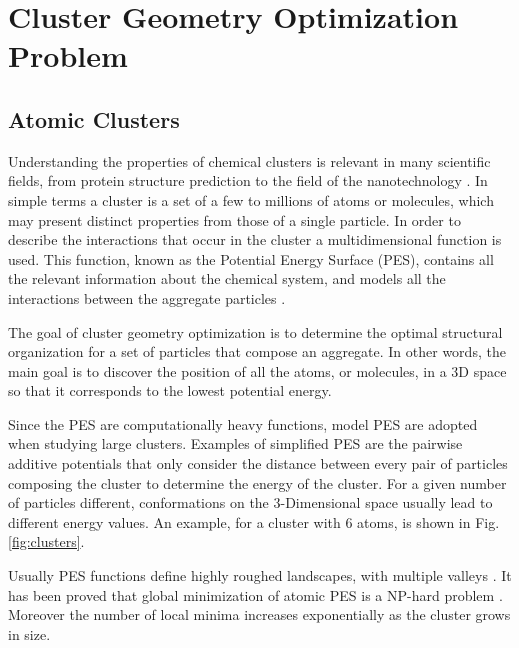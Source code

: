 \chapter{Cluster Geometry Optimization Problem}


\section{Atomic Clusters}

Understanding the properties of chemical clusters is relevant in many scientific fields, from protein structure prediction to the field of the nanotechnology \cite{wales97}. In simple terms a cluster is a set of a few to millions of atoms or molecules, which may present distinct properties from those of a single particle. In order to describe the interactions that occur in the cluster a multidimensional function is used. This function, known as the Potential Energy Surface (PES), contains all the relevant information about the chemical system, and models all the interactions between the aggregate particles \cite{doye06}.

The goal of cluster geometry optimization is to determine the optimal structural organization for a set of particles that compose an aggregate. In other words, the main goal is to discover the position of all the atoms, or molecules, in a 3D space so that it corresponds to the lowest potential energy.

Since the PES are computationally heavy functions, model PES are adopted when studying large clusters. Examples of simplified PES are the pairwise additive potentials that only consider the distance between every pair of particles composing the cluster to determine the energy of the cluster. For a given number of particles different, conformations on the 3-Dimensional space usually lead to different energy values. An example, for a cluster with 6 atoms, is shown in Fig. \ref{fig:clusters}.


\pagebreak

Usually PES functions define highly roughed landscapes, with multiple valleys \cite{stillinger99}. It has been proved that global minimization of atomic PES is a NP-hard problem \cite{doye98, wille85}. Moreover the number of local minima increases exponentially as the cluster grows in size.




